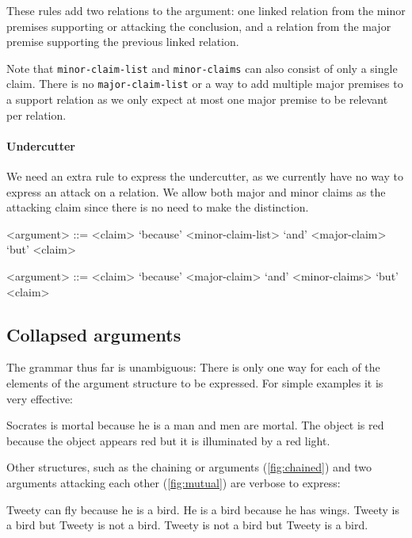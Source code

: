 \noindent These rules add two relations to the argument: one linked relation from the minor premises supporting or attacking the conclusion, and a relation from the major premise supporting the previous linked relation.

Note that \texttt{minor-claim-list} and \texttt{minor-claims} can also consist of only a single claim. There is no \texttt{major-claim-list} or a way to add multiple major premises to a support relation as we only expect at most one major premise to be relevant per relation.

\paragraph{Undercutter}
We need an extra rule to express the undercutter, as we currently have no way to express an attack on a relation. We allow both major and minor claims as the attacking claim since there is no need to make the distinction.

\begin{grammar}
<argument> ::= <claim> `because' <minor-claim-list> `and' <major-claim> `but' <claim> %

<argument> ::= <claim> `because' <major-claim> `and' <minor-claims> `but' <claim> %
\end{grammar}

\subsection{Collapsed arguments}
The grammar thus far is unambiguous: There is only one way for each of the elements of the argument structure to be expressed. For simple examples it is very effective:

\begin{exe}
    \ex Socrates is mortal because he is a man and men are mortal.
    \ex The object is red because the object appears red but it is illuminated by a red light.
\end{exe}

\noindent Other structures, such as the chaining or arguments (\autoref{fig:chained}) and two arguments attacking each other (\autoref{fig:mutual}) are verbose to express:

\begin{exe}
    \ex\label{ex:hasl0tbw} Tweety can fly because he is a bird. He is a bird because he has wings.
    \ex\label{ex:hasl0tbnottb} Tweety is a bird but Tweety is not a bird. Tweety is not a bird but Tweety is a bird.
\end{exe}

